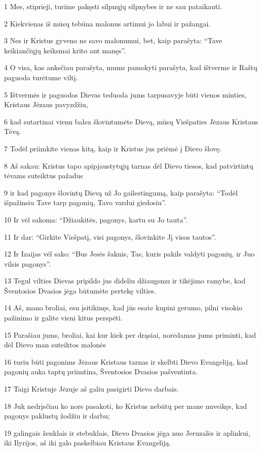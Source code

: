 \par 1 Mes, stiprieji, turime pakęsti silpnųjų silpnybes ir ne sau pataikauti. 
\par 2 Kiekvienas iš mūsų tebūna malonus artimui jo labui ir pažangai. 
\par 3 Nes ir Kristus gyveno ne savo malonumui, bet, kaip parašyta: “Tave keikiančiųjų keiksmai krito ant manęs”. 
\par 4 O visa, kas anksčiau parašyta, mums pamokyti parašyta, kad ištverme ir Raštų paguoda turėtume viltį. 
\par 5 Ištvermės ir paguodos Dievas teduoda jums tarpusavyje būti vienos minties, Kristaus Jėzaus pavyzdžiu, 
\par 6 kad sutartinai vienu balsu šlovintumėte Dievą, mūsų Viešpaties Jėzaus Kristaus Tėvą. 
\par 7 Todėl priimkite vienas kitą, kaip ir Kristus jus priėmė į Dievo šlovę. 
\par 8 Aš sakau: Kristus tapo apipjaustytųjų tarnas dėl Dievo tiesos, kad patvirtintų tėvams suteiktus pažadus 
\par 9 ir kad pagonys šlovintų Dievą už Jo gailestingumą, kaip parašyta: “Todėl išpažinsiu Tave tarp pagonių, Tavo vardui giedosiu”. 
\par 10 Ir vėl sakoma: “Džiaukitės, pagonys, kartu su Jo tauta”. 
\par 11 Ir dar: “Girkite Viešpatį, visi pagonys, šlovinkite Jį visos tautos”. 
\par 12 Ir Izaijas vėl sako: “Bus Jesės šaknis, Tas, kuris pakils valdyti pagonių, ir Juo vilsis pagonys”. 
\par 13 Tegul vilties Dievas pripildo jus dideliu džiaugsmu ir tikėjimo ramybe, kad Šventosios Dvasios jėga būtumėte pertekę vilties. 
\par 14 Aš, mano broliai, esu įsitikinęs, kad jūs esate kupini gerumo, pilni visokio pažinimo ir galite vieni kitus perspėti. 
\par 15 Parašiau jums, broliai, kai kur kiek per drąsiai, norėdamas jums priminti, kad dėl Dievo man suteiktos malonės 
\par 16 turiu būti pagonims Jėzaus Kristaus tarnas ir skelbti Dievo Evangeliją, kad pagonių auka taptų priimtina, Šventosios Dvasios pašventinta. 
\par 17 Taigi Kristuje Jėzuje aš galiu pasigirti Dievo darbais. 
\par 18 Juk nedrįsčiau ko nors pasakoti, ko Kristus nebūtų per mane nuveikęs, kad pagonys paklustų žodžiu ir darbu; 
\par 19 galingais ženklais ir stebuklais, Dievo Dvasios jėga nuo Jeruzalės ir aplinkui, iki Ilyrijos, aš iki galo paskelbiau Kristaus Evangeliją. 
